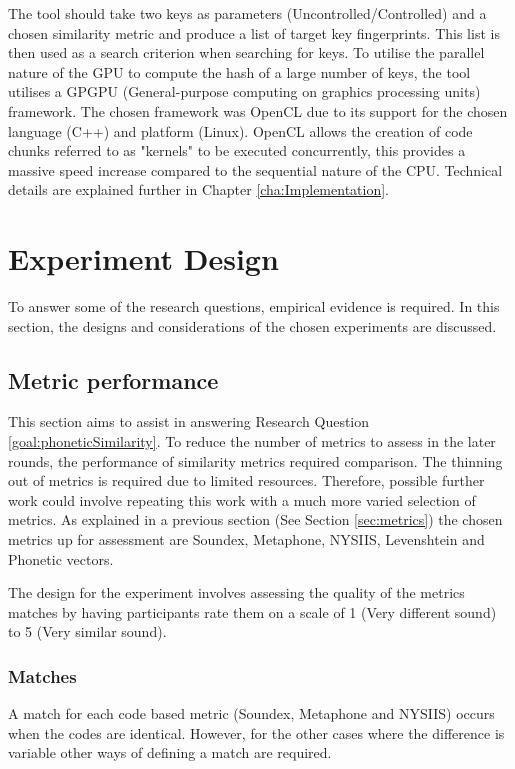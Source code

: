 The tool should take two keys as parameters (Uncontrolled/Controlled) and a chosen similarity metric and produce a list of target key fingerprints. This list is then used as a search criterion when searching for keys. To utilise the parallel nature of the GPU to compute the hash of a large number of keys, the tool utilises a GPGPU (General-purpose computing on graphics processing units) framework. The chosen framework was OpenCL due to its support for the chosen language (C++) and platform (Linux). OpenCL allows the creation of code chunks referred to as "kernels" to be executed concurrently, this provides a massive speed increase compared to the sequential nature of the CPU. Technical details are explained further in Chapter \ref{cha:Implementation}.

\section{Experiment Design}
To answer some of the research questions, empirical evidence is required. In this section, the designs and considerations of the chosen experiments are discussed.

\subsection{Metric performance}
\label{exp:metric}
This section aims to assist in answering Research Question \ref{goal:phoneticSimilarity}. To reduce the number of metrics to assess in the later rounds, the performance of similarity metrics required comparison. The thinning out of metrics is required due to limited resources. Therefore, possible further work could involve repeating this work with a much more varied selection of metrics. As explained in a previous section (See Section \ref{sec:metrics}) the chosen metrics up for assessment are Soundex, Metaphone, NYSIIS, Levenshtein and Phonetic vectors.

The design for the experiment involves assessing the quality of the metrics matches by having participants rate them on a scale of 1 (Very different sound) to 5 (Very similar sound).

\subsubsection{Matches}
\label{sec:matches}

A match for each code based metric (Soundex, Metaphone and NYSIIS) occurs when the codes are identical. However, for the other cases where the difference is variable other ways of defining a match are required.

